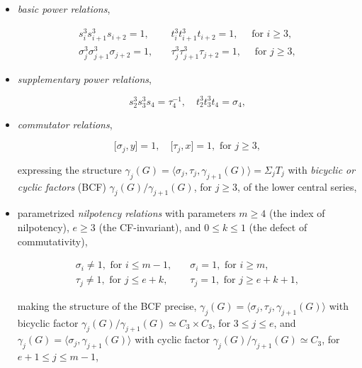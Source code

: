 \documentclass{amsart}
\theoremstyle{definition}
\numberwithin{equation}{section}
\begin{document}
\begin{itemize}

\item
\textit{basic power relations},

\begin{equation}
\label{eqn:LowPowerRel}
\begin{aligned}
s_i^3s_{i+1}^3s_{i+2}=1,                &\quad t_i^3t_{i+1}^3t_{i+2}=1, \quad \text{ for } i\ge 3, \\
\sigma_j^3\sigma_{j+1}^3\sigma_{j+2}=1, &\quad \tau_j^3\tau_{j+1}^3\tau_{j+2}=1, \quad \text{ for } j\ge 3,
\end{aligned}
\end{equation}

\item
\textit{supplementary power relations},

\begin{equation}
\label{eqn:LowSupplPowerRel}
s_2^3s_3^3s_4=\tau_4^{-1}, \quad t_2^3t_3^3t_4=\sigma_4,
\end{equation}

\item
\textit{commutator relations},

\begin{equation}
\label{eqn:LowCommutatorRel}
\lbrack\sigma_j,y\rbrack=1, \quad \lbrack\tau_j,x\rbrack=1, \text{ for } j\ge 3,
\end{equation}

\noindent
expressing the structure \(\gamma_j(G)=\langle\sigma_j,\tau_j,\gamma_{j+1}(G)\rangle=\Sigma_j T_j\)
with \textit{bicyclic or cyclic factors} (BCF) \(\gamma_j(G)/\gamma_{j+1}(G)\), for \(j\ge 3\),
of the lower central series,

\item
parametrized \textit{nilpotency relations} with parameters
\(m\ge 4\) (the index of nilpotency),
\(e\ge 3\) (the CF-invariant), and
\(0\le k\le 1\) (the defect of commutativity),

\begin{equation}
\label{eqn:LowNilpotencyRel}
\begin{aligned}
\sigma_i\ne 1,  \text{ for } i\le m-1, &\quad \sigma_i=1, \text{ for } i\ge m, \\
\tau_j\ne 1, \text{ for } j\le e+k,    &\quad \tau_j=1, \text{ for } j\ge e+k+1,
\end{aligned}
\end{equation}

\noindent
making the structure of the BCF precise,
\(\gamma_j(G)=\langle\sigma_j,\tau_j,\gamma_{j+1}(G)\rangle\)
with bicyclic factor \(\gamma_j(G)/\gamma_{j+1}(G)\simeq C_3\times C_3\), for \(3\le j\le e\), and
\(\gamma_j(G)=\langle\sigma_j,\gamma_{j+1}(G)\rangle\)
with cyclic factor \(\gamma_j(G)/\gamma_{j+1}(G)\simeq C_3\), for \(e+1\le j\le m-1\),


\end{itemize}
\end{document}
